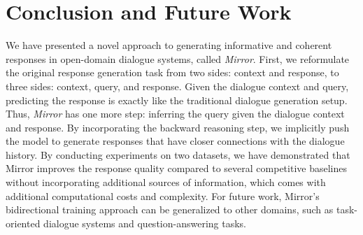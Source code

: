 \documentclass[sigconf]{acmart}
\begin{document}
\section{Conclusion and Future Work}
\label{sec:conclusion}
We have presented a novel approach to generating informative and coherent responses in open-domain dialogue systems, called \emph{Mirror}. First, we reformulate the original response generation task from two sides: context and response, to three sides: context, query, and response. Given the dialogue context and query, predicting the response is exactly like the traditional dialogue generation setup. Thus, \emph{Mirror} has one more step: inferring the query given the dialogue context and response.
By incorporating the backward reasoning step, we implicitly push the model to generate responses that have closer connections with the dialogue history. 
%
By conducting experiments on two datasets, we have demonstrated that Mirror improves the response quality compared to several competitive baselines without incorporating additional sources of information, which comes with additional computational costs and complexity. 
%
For future work, Mirror's bidirectional training approach can be generalized to other domains, such as task-oriented dialogue systems and question-answering tasks.


% 
\clearpage



\end{document}
